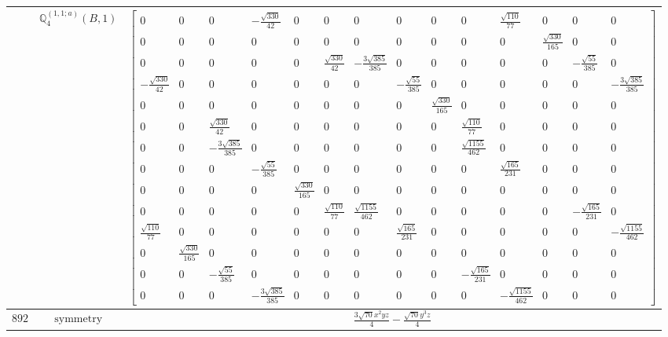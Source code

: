\documentclass[fleqn,8pt,landscape]{jsarticle}
\begin{document}
\begin{longtable}{ccc}
$  $ & $ \mathbb{Q}_{4}^{(1,1;a)}(B,1) $ & $ \begin{bmatrix} 0 & 0 & 0 & - \frac{\sqrt{330}}{42} & 0 & 0 & 0 & 0 & 0 & 0 & \frac{\sqrt{110}}{77} & 0 & 0 & 0 \\ 0 & 0 & 0 & 0 & 0 & 0 & 0 & 0 & 0 & 0 & 0 & \frac{\sqrt{330}}{165} & 0 & 0 \\ 0 & 0 & 0 & 0 & 0 & \frac{\sqrt{330}}{42} & - \frac{3 \sqrt{385}}{385} & 0 & 0 & 0 & 0 & 0 & - \frac{\sqrt{55}}{385} & 0 \\ - \frac{\sqrt{330}}{42} & 0 & 0 & 0 & 0 & 0 & 0 & - \frac{\sqrt{55}}{385} & 0 & 0 & 0 & 0 & 0 & - \frac{3 \sqrt{385}}{385} \\ 0 & 0 & 0 & 0 & 0 & 0 & 0 & 0 & \frac{\sqrt{330}}{165} & 0 & 0 & 0 & 0 & 0 \\ 0 & 0 & \frac{\sqrt{330}}{42} & 0 & 0 & 0 & 0 & 0 & 0 & \frac{\sqrt{110}}{77} & 0 & 0 & 0 & 0 \\ 0 & 0 & - \frac{3 \sqrt{385}}{385} & 0 & 0 & 0 & 0 & 0 & 0 & \frac{\sqrt{1155}}{462} & 0 & 0 & 0 & 0 \\ 0 & 0 & 0 & - \frac{\sqrt{55}}{385} & 0 & 0 & 0 & 0 & 0 & 0 & \frac{\sqrt{165}}{231} & 0 & 0 & 0 \\ 0 & 0 & 0 & 0 & \frac{\sqrt{330}}{165} & 0 & 0 & 0 & 0 & 0 & 0 & 0 & 0 & 0 \\ 0 & 0 & 0 & 0 & 0 & \frac{\sqrt{110}}{77} & \frac{\sqrt{1155}}{462} & 0 & 0 & 0 & 0 & 0 & - \frac{\sqrt{165}}{231} & 0 \\ \frac{\sqrt{110}}{77} & 0 & 0 & 0 & 0 & 0 & 0 & \frac{\sqrt{165}}{231} & 0 & 0 & 0 & 0 & 0 & - \frac{\sqrt{1155}}{462} \\ 0 & \frac{\sqrt{330}}{165} & 0 & 0 & 0 & 0 & 0 & 0 & 0 & 0 & 0 & 0 & 0 & 0 \\ 0 & 0 & - \frac{\sqrt{55}}{385} & 0 & 0 & 0 & 0 & 0 & 0 & - \frac{\sqrt{165}}{231} & 0 & 0 & 0 & 0 \\ 0 & 0 & 0 & - \frac{3 \sqrt{385}}{385} & 0 & 0 & 0 & 0 & 0 & 0 & - \frac{\sqrt{1155}}{462} & 0 & 0 & 0 \end{bmatrix} $ \\ \hline
$ 892 $ & $ \text{symmetry} $ & $ \frac{3 \sqrt{70} x^{2} y z}{4} - \frac{\sqrt{70} y^{3} z}{4} $ \\

\end{longtable}
\end{document}
